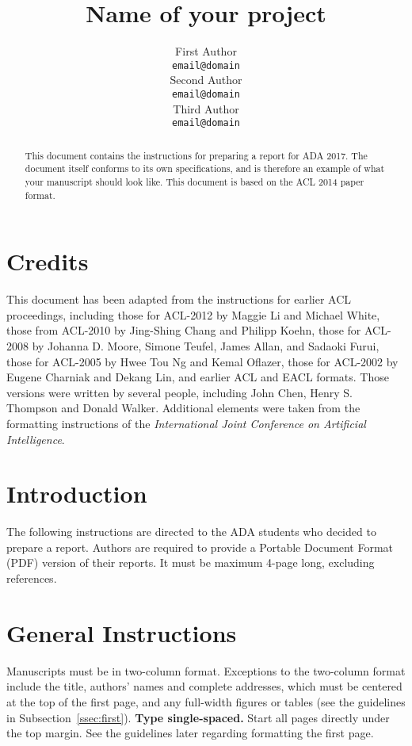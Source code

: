 \documentclass[11pt]{article}
\title{Name of your project}
\author{First Author \\
  {\tt email@domain} \\\And
  Second Author \\
  {\tt email@domain} \\\And
Third Author \\
{\tt email@domain} \\}
\date{}
\begin{document}
\maketitle
\begin{abstract}
  This document contains the instructions for preparing a report for ADA 2017. The document itself conforms to its own specifications, and is therefore an example of
  what your manuscript should look like. This document is based on the ACL 2014 paper format.
\end{abstract}

\section{Credits}

This document has been adapted from the instructions for earlier ACL
proceedings, including those for ACL-2012 by Maggie Li and Michael
White, those from ACL-2010 by Jing-Shing Chang and Philipp Koehn,
those for ACL-2008 by Johanna D. Moore, Simone Teufel, James Allan,
and Sadaoki Furui, those for ACL-2005 by Hwee Tou Ng and Kemal
Oflazer, those for ACL-2002 by Eugene Charniak and Dekang Lin, and
earlier ACL and EACL formats. Those versions were written by several
people, including John Chen, Henry S. Thompson and Donald
Walker. Additional elements were taken from the formatting
instructions of the {\em International Joint Conference on Artificial
  Intelligence}.

\section{Introduction}

The following instructions are directed to the ADA students who decided to prepare a report. Authors are
required to provide a Portable Document Format (PDF) version of their
reports. It must be maximum 4-page long, excluding references.

\section{General Instructions}

Manuscripts must be in two-column format.  Exceptions to the
two-column format include the title, authors' names and complete
addresses, which must be centered at the top of the first page, and
any full-width figures or tables (see the guidelines in
Subsection~\ref{ssec:first}). {\bf Type single-spaced.}  Start all
pages directly under the top margin. See the guidelines later
regarding formatting the first page.
\end{document}
